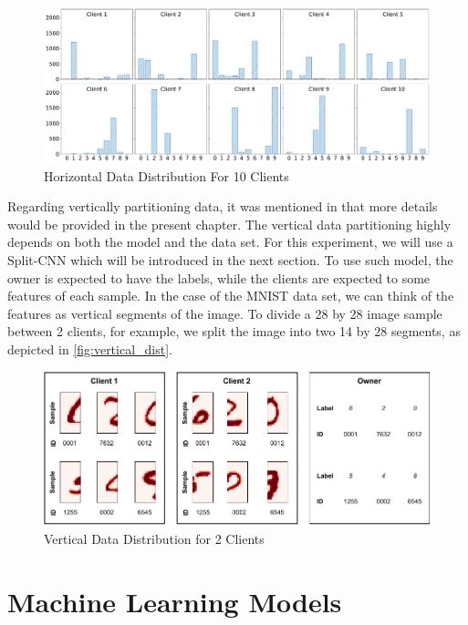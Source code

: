 \begin{figure}[!ht]
    \centering
    \centering
    \includegraphics[width=1\textwidth]{graphics/10_dist.pdf}
    \caption{Horizontal Data Distribution For 10 Clients}
    \label{fig:horizontal_dist}
\end{figure}

Regarding vertically partitioning data, it was mentioned in  that more details would be provided in the present chapter. The vertical data partitioning highly depends on both the model and the data set. For this experiment, we will use a Split-CNN which will be introduced in the next section. To use such model, the owner is expected to have the labels, while the clients are expected to some features of each sample. In the case of the MNIST data set, we can think of the features as vertical segments of the image. To divide a 28 by 28 image sample between 2 clients, for example, we split the image into two 14 by 28 segments, as depicted in \autoref{fig:vertical_dist}.

\begin{figure}[!ht]
    \centering
    \centering
    \includegraphics[width=1\textwidth]{graphics/vertical_partitioning.pdf}
    \caption{Vertical Data Distribution for 2 Clients}
    \label{fig:vertical_dist}
\end{figure}

\section{Machine Learning Models}

